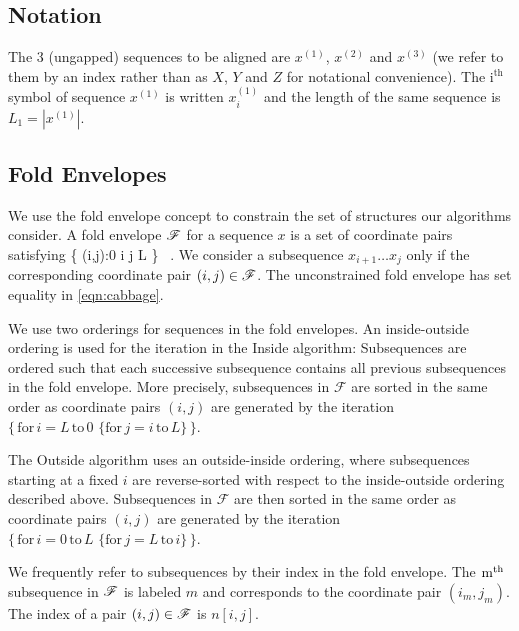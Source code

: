 \documentclass[10pt]{article}
\begin{document}
\subsection{Notation}
The 3 (ungapped) sequences to be aligned are $x^{(1)}$, $x^{(2)}$ and $x^{(3)}$
(we refer to them by an index rather than as $X$, $Y$ and $Z$ for notational convenience).
The $\mathrm{i}^{\mathrm{th}}$ symbol of sequence $x^{(1)}$ is written $x^{(1)}_i$ 
and the length of the same sequence is $L_1 = |x^{(1)}|$.


\subsection{Fold Envelopes} 
We use the fold envelope concept \cite{HolmesRubin2002a,Holmes2004} to constrain the set of structures our algorithms consider.
A fold envelope $\mathscr{F}$ for a sequence $x$ is a set of coordinate pairs satisfying
\beqn \label{eqn:cabbage}
\foldenv \subset \left\{ (i,j):0 \le i \le j \le L \right\} \, .
\eeqn
We consider a subsequence $x_{i+1} \dots x_{j}$ only if the corresponding coordinate pair $(i,j) \in \mathscr{F}$.
The unconstrained fold envelope has set equality in \eqref{eqn:cabbage}.

We use two orderings for sequences in the fold envelopes.  An inside-outside ordering is used for the iteration 
in the Inside algorithm: Subsequences are ordered such that each successive subsequence 
contains all previous subsequences in the fold envelope.  More precisely, subsequences in $\mathscr{F}$ are sorted  
in the same order as coordinate pairs $(i,j)$ are generated by the iteration $\{\,\mathrm{for}\, i = L \,\mathrm{to}\, 0 \,\,\{ \mathrm{for}\, j = i \,\mathrm{to}\, L \}\,\}$.

The Outside algorithm uses an outside-inside ordering, where subsequences starting at a fixed $i$ are reverse-sorted 
with respect to the inside-outside ordering described above.  Subsequences in $\mathscr{F}$ are then sorted 
in the same order as coordinate pairs $(i,j)$ are generated by the 
iteration $\{\,\mathrm{for}\, i = 0 \,\mathrm{to}\, L \,\,\{ \mathrm{for}\, j = L\, \mathrm{to}\, i \}\,\}$.

We frequently refer to subsequences by their index in the fold envelope.
The $\mathrm{m}^{\mathrm{th}}$ subsequence in $\mathscr{F}$ is labeled $m$ and corresponds to the coordinate pair $(i_{m}, j_{m})$.  The 
index of a pair $(i,j) \in \mathscr{F}$ is $n[i,j]$.
\end{document}
